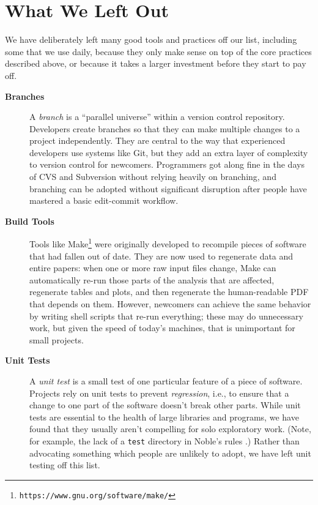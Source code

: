 \documentclass[10pt,letterpaper]{article}
\newcommand{\withurl}[2]{{#1}\footnote{{\texttt{#2}}}}
\newcommand{\practicesection}[2]{\section{#1}\label{#2}}
\begin{document}
\practicesection{What We Left Out}{sec:omitted}

We have deliberately left many good tools and practices off our list,
including some that we use daily, because they only make sense on top
of the core practices described above, or because it takes a larger
investment before they start to pay off.

\begin{description}

\item[\textbf{Branches}] A \emph{branch} is a ``parallel universe''
  within a version control repository. Developers create branches so
  that they can make multiple changes to a project independently. They
  are central to the way that experienced developers use systems like
  Git, but they add an extra layer of complexity to version control
  for newcomers.  Programmers got along fine in the days of CVS and
  Subversion without relying heavily on branching, and branching can
  be adopted without significant disruption after people have mastered
  a basic edit-commit workflow.

\item[\textbf{Build Tools}] Tools like
  \withurl{Make}{https://www.gnu.org/software/make/} were originally
  developed to recompile pieces of software that had fallen out of
  date. They are now used to regenerate data and entire papers: when
  one or more raw input files change, Make can automatically re-run
  those parts of the analysis that are affected, regenerate tables and
  plots, and then regenerate the human-readable PDF that depends on
  them.  However, newcomers can achieve the same behavior by writing
  shell scripts that re-run everything; these may do unnecessary work,
  but given the speed of today's machines, that is unimportant for
  small projects.

\item[\textbf{Unit Tests}] A \emph{unit test} is a small test of one
  particular feature of a piece of software. Projects rely on unit
  tests to prevent \emph{regression}, i.e., to ensure that a change to
  one part of the software doesn't break other parts. While unit tests
  are essential to the health of large libraries and programs, we have
  found that they usually aren't compelling for solo exploratory
  work. (Note, for example, the lack of a \texttt{test} directory in
  Noble's rules \cite{noble2009}.)  Rather than advocating something
  which people are unlikely to adopt, we have left unit testing off
  this list.


\end{description}
\end{document}

